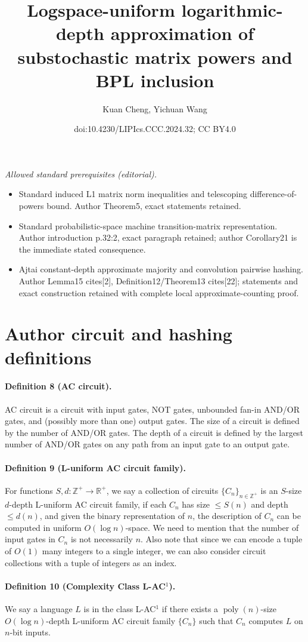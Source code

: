 \documentclass[10pt,a4paper]{article}
\title{Logspace-uniform logarithmic-depth approximation of substochastic matrix powers and BPL inclusion}
\author{Kuan Cheng, Yichuan Wang}
\date{doi:10.4230/LIPIcs.CCC.2024.32; CC BY4.0}
\begin{document}
\maketitle
\noindent\textit{Allowed standard prerequisites (editorial).}\begin{itemize}
\item Standard induced L1 matrix norm inequalities and telescoping difference-of-powers bound. Author Theorem5, exact statements retained.
\item Standard probabilistic-space machine transition-matrix representation. Author introduction p.32:2, exact paragraph retained; author Corollary21 is the immediate stated consequence.
\item Ajtai constant-depth approximate majority and convolution pairwise hashing. Author Lemma15 cites[2], Definition12/Theorem13 cites[22]; statements and exact construction retained with complete local approximate-counting proof.
\end{itemize}\medskip
\section*{Author circuit and hashing definitions}
\paragraph{Definition 8 (AC circuit).} AC circuit is a circuit with input gates, NOT gates, unbounded fan-in AND/OR gates, and (possibly more than one) output gates. The size of a circuit is defined by the number of AND/OR gates. The depth of a circuit is defined by the largest number of AND/OR gates on any path from an input gate to an output gate.
\paragraph{Definition 9 (L-uniform AC circuit family).} For functions $S,d:\mathbb Z^+\to\mathbb R^+$, we say a collection of circuits $\{C_n\}_{n\in\mathbb Z^+}$ is an $S$-size $d$-depth L-uniform AC circuit family, if each $C_n$ has size $\le S(n)$ and depth $\le d(n)$, and given the binary representation of $n$, the description of $C_n$ can be computed in uniform $O(\log n)$-space.
We need to mention that the number of input gates in $C_n$ is not necessarily $n$. Also note that since we can encode a tuple of $O(1)$ many integers to a single integer, we can also consider circuit collections with a tuple of integers as an index.
\paragraph{Definition 10 (Complexity Class L-AC$^1$).} We say a language $L$ is in the class L-AC$^1$ if there exists a $\operatorname{poly}(n)$-size $O(\log n)$-depth L-uniform AC circuit family $\{C_n\}$ such that $C_n$ computes $L$ on $n$-bit inputs.
\end{document}

